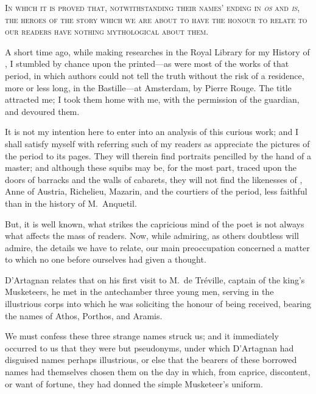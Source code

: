 

\begin{center}\scshape
In which it is proved that, notwithstanding their names' ending in \textit{os} and \textit{is}, the heroes of the story which we are about to have the honour to relate to our readers have nothing mythological about them. 
\end{center}
	
\lettrine{A}{} short time ago, while making researches in the Royal Library for my History of , I stumbled by chance upon the  printed—as were most of the works of that period, in which authors could not tell the truth without the risk of a residence, more or less long, in the Bastille—at Amsterdam, by Pierre Rouge. The title attracted me; I took them home with me, with the permission of the guardian, and devoured them. 

It is not my intention here to enter into an analysis of this curious work; and I shall satisfy myself with referring such of my readers as appreciate the pictures of the period to its pages. They will therein find portraits pencilled by the hand of a master; and although these squibs may be, for the most part, traced upon the doors of barracks and the walls of cabarets, they will not find the likenesses of , Anne of Austria, Richelieu, Mazarin, and the courtiers of the period, less faithful than in the history of M.~Anquetil. 

But, it is well known, what strikes the capricious mind of the poet is not always what affects the mass of readers. Now, while admiring, as others doubtless will admire, the details we have to relate, our main preoccupation concerned a matter to which no one before ourselves had given a thought. 

D'Artagnan relates that on his first visit to M.~de Tréville, captain of the king's Musketeers, he met in the antechamber three young men, serving in the illustrious corps into which he was soliciting the honour of being received, bearing the names of Athos, Porthos, and Aramis. 

We must confess these three strange names struck us; and it immediately occurred to us that they were but pseudonyms, under which D'Artagnan had disguised names perhaps illustrious, or else that the bearers of these borrowed names had themselves chosen them on the day in which, from caprice, discontent, or want of fortune, they had donned the simple Musketeer's uniform. 

